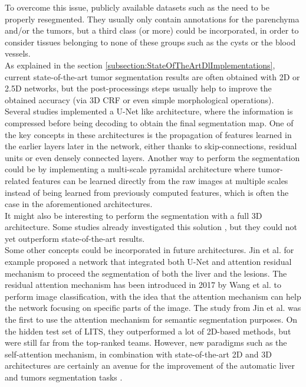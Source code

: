 To overcome this issue, publicly available datasets such as the
 need to be properly resegmented. They usually only contain
annotations for the parenchyma and/or the tumors, but a third class (or
more) could be incorporated, in order to consider tissues belonging to none of
these groups such as the cysts or the blood vessels.\\
As explained in the section  \ref{subsection:StateOfTheArtDlImplementations}, current state-of-the-art tumor
segmentation results are often obtained with 2D or 2.5D networks, but
the post-processings steps usually help to improve the obtained accuracy
(via 3D CRF or even simple morphological operations). Several studies
implemented a U-Net like architecture, where the information is
compressed before being decoding to obtain the final segmentation map.
One of the key concepts in these architectures is the propagation of
features learned in the earlier layers later in the network, either
thanks to skip-connections, residual units or even densely connected
layers. Another way to perform the segmentation could be by implementing a
multi-scale pyramidal architecture where tumor-related features can be
learned directly from the raw images at multiple scales instead of being
learned from previously computed features, which is often the case in
the aforementioned architectures.\\
It might also be interesting to perform the segmentation with a full 3D
architecture. Some studies already investigated this solution \cite{Dou2016}, 
but they could not yet outperform state-of-the-art results. \\
Some other concepts could be incorporated in future architectures. Jin et
al. \cite{Jin2018} for example proposed a network that integrated both U-Net and
attention residual mechanism to proceed the segmentation of both the
liver and the lesions. The residual attention mechanism has been
introduced in 2017 by Wang et al. \cite{Wang2017} to perform image
classification, with the idea that the attention mechanism can help the
network focusing on specific parts of the image. The study from Jin et
al. was the first to use the attention mechanism for
semantic segmentation purposes. On the hidden test set of LITS, they
outperformed a lot of 2D-based methods, but were still far from the
top-ranked teams. However, new paradigms such as the self-attention
mechanism, in combination with state-of-the-art 2D and 3D architectures
are certainly an avenue for the improvement of the automatic liver and
tumors segmentation tasks \cite{Chen2019}.


